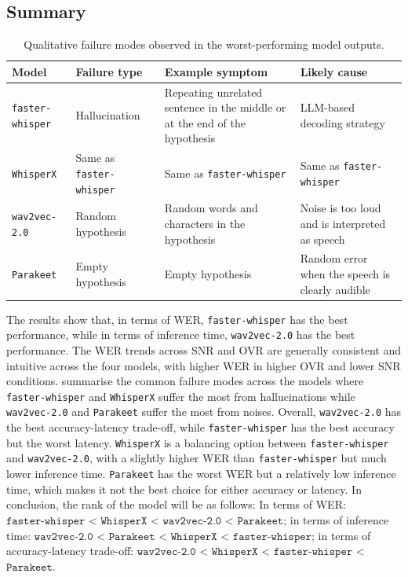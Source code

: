 \subsection{Summary}

\begin{table}[htbp]
\centering
\caption{Qualitative failure modes observed in the worst-performing model outputs.}
\label{tab:model_failure_modes}
\small
\begin{tabularx}{\linewidth}{l l X X}
\toprule
\textbf{Model} & \textbf{Failure type} & \textbf{Example symptom} & \textbf{Likely cause} \\
\midrule
\texttt{faster-whisper} & Hallucination & Repeating unrelated sentence in the middle or at the end of the hypothesis & LLM-based decoding strategy \\
\texttt{WhisperX} & Same as \texttt{faster-whisper} & Same as \texttt{faster-whisper} & Same as \texttt{faster-whisper} \\
\texttt{wav2vec-2.0} & Random hypothesis & Random words and characters in the hypothesis & Noise is too loud and is interpreted as speech \\
\texttt{Parakeet} & Empty hypothesis & Empty hypothesis & Random error when the speech is clearly audible \\
\bottomrule
\end{tabularx}
\normalsize
\end{table}

The results show that, in terms of WER, \texttt{faster-whisper} has the best performance, while in terms of inference time, \texttt{wav2vec-2.0} has the best performance. The WER trends across SNR and OVR are generally consistent and intuitive across the four models, with higher WER in higher OVR and lower SNR conditions.  summarise the common failure modes across the models where \texttt{faster-whisper} and \texttt{WhisperX} suffer the most from hallucinations while \texttt{wav2vec-2.0} and \texttt{Parakeet} suffer the most from noises. Overall, \texttt{wav2vec-2.0} has the best accuracy-latency trade-off, while \texttt{faster-whisper} has the best accuracy but the worst latency. \texttt{WhisperX} is a balancing option between \texttt{faster-whisper} and \texttt{wav2vec-2.0}, with a slightly higher WER than \texttt{faster-whisper} but much lower inference time. \texttt{Parakeet} has the worst WER but a relatively low inference time, which makes it not the best choice for either accuracy or latency. In conclusion, the rank of the model will be as follows:
In terms of WER: $\texttt{faster-whisper}$ < $\texttt{WhisperX}$ < $\texttt{wav2vec-2.0}$ < $\texttt{Parakeet}$; in terms of inference time: $\texttt{wav2vec-2.0}$ < $\texttt{Parakeet}$ < $\texttt{WhisperX}$ < $\texttt{faster-whisper}$; in terms of accuracy-latency trade-off: $\texttt{wav2vec-2.0}$ < $\texttt{WhisperX}$ < $\texttt{faster-whisper}$ < $\texttt{Parakeet}$.

